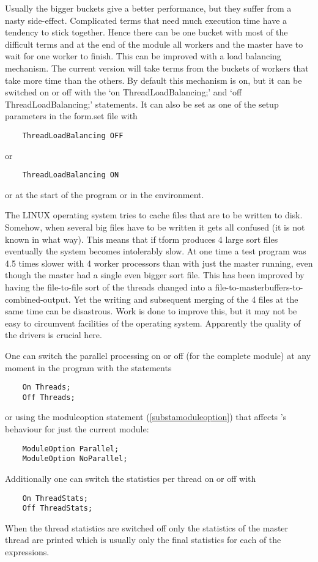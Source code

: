 Usually the bigger buckets give a better performance, but they suffer from 
a nasty side-effect. Complicated terms that need much execution time have a 
tendency to stick together. Hence there can be one bucket with most of the 
difficult terms and at the end of the module all workers and the master 
have to wait for one worker to finish. This can be improved with a 
load balancing mechanism. The current version will 
take terms from the buckets of workers that take more time than the others. 
By default this mechanism is on, but it can be switched on or off with the 
`on ThreadLoadBalancing;' and `off 
ThreadLoadBalancing;' statements. It can also be set as one of the setup 
parameters in the form.set file with
\begin{verbatim}
    ThreadLoadBalancing OFF
\end{verbatim}
or
\begin{verbatim}
    ThreadLoadBalancing ON
\end{verbatim}
or at the start of the program or in the environment.

The LINUX operating system tries to cache files 
that are to be written to disk. Somehow, when several big files have to be 
written it gets all confused (it is not known in what way). This means that 
if tform produces 4 large sort files eventually the system 
becomes intolerably slow. At one time a test program was 4.5 times slower 
with 4 worker processors than with just the master running, even though the 
master had a single even bigger sort file. This has been improved by having 
the file-to-file sort of the threads changed into a 
file-to-masterbuffers-to-combined-output. Yet the writing and subsequent 
merging of the 4 files at the same time can be disastrous. Work is done to 
improve this, but it may not be easy to circumvent facilities of the 
operating system. Apparently the quality of the drivers is crucial here. 

One can switch the parallel processing on or off (for the complete module) 
at any moment in the program with the 
statements
\begin{verbatim}
    On Threads;
    Off Threads;
\end{verbatim}
or using the moduleoption statement (\ref{substamoduleoption}) that
affects \TFORM{}'s behaviour for just the current module:
\begin{verbatim}
    ModuleOption Parallel;
    ModuleOption NoParallel;
\end{verbatim}
Additionally one can switch the statistics per thread on or off with
\begin{verbatim}
    On ThreadStats;
    Off ThreadStats;
\end{verbatim}
When the thread statistics are 
switched off only the statistics of the master thread are printed which is 
usually only the final statistics for each of the expressions.

